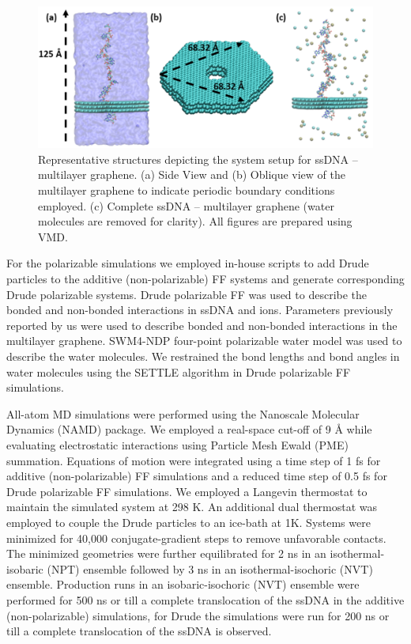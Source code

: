 \begin{figure}
    \centering
    \includegraphics[width=\textwidth]{Chapter4/Figures/Figure1.png}
    \caption[Representative structures depicting the system setup for ssDNA – multilayer graphene.]{Representative structures depicting the system setup for ssDNA – multilayer graphene. (a) Side View and (b) Oblique view of the multilayer graphene to indicate periodic boundary conditions employed. (c) Complete ssDNA – multilayer graphene (water molecules are removed for clarity). All figures are prepared using VMD.\supercite{humphrey_vmd_1996}}
\end{figure}

For the polarizable simulations we employed in-house scripts to add Drude particles to the additive (non-polarizable) FF systems and generate corresponding Drude polarizable systems. Drude polarizable FF was used to describe the bonded and non-bonded interactions in ssDNA\supercite{baker_development_2011,savelyev_all-atom_2014} and ions.\supercite{lin_polarizable_2018} Parameters previously reported by us were used to describe bonded and non-bonded interactions in the multilayer graphene.\supercite{h_polarization_2021} SWM4-NDP four-point polarizable water model was used to describe the water molecules.\supercite{lamoureux_polarizable_2006} We restrained the bond lengths and bond angles in water molecules using the SETTLE\supercite{miyamoto_settle_1992} algorithm in Drude polarizable FF simulations.

All-atom MD simulations were performed using the Nanoscale Molecular Dynamics (NAMD) package.\supercite{phillips_scalable_2005} We employed a real-space cut-off of 9 Å while evaluating electrostatic interactions using Particle Mesh Ewald\supercite{darden_particle_1993} (PME) summation. Equations of motion were integrated using a time step of 1 fs for additive (non-polarizable) FF simulations and a reduced time step of 0.5 fs for Drude polarizable FF simulations. We employed a Langevin thermostat to maintain the simulated system at 298 K. An additional dual thermostat was employed to couple the Drude particles to an ice-bath at 1K. Systems were minimized for 40,000 conjugate-gradient steps to remove unfavorable contacts. The minimized geometries were further equilibrated for 2 ns in an isothermal-isobaric (NPT) ensemble followed by 3 ns in an isothermal-isochoric (NVT) ensemble.  Production runs in an isobaric-isochoric (NVT) ensemble were performed for 500 ns or till a complete translocation of the ssDNA in the additive (non-polarizable) simulations, for Drude the simulations were run for 200 ns or till a complete translocation of the ssDNA is observed. 

